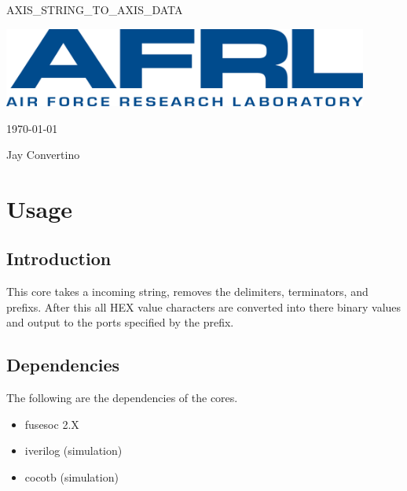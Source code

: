\begin{titlepage}
  \begin{center}

  {\Huge AXIS\_STRING\_TO\_AXIS\_DATA}

  \vspace{25mm}

  \includegraphics[width=0.90\textwidth,height=\textheight,keepaspectratio]{img/AFRL.png}

  \vspace{25mm}

  \today

  \vspace{15mm}

  {\Large Jay Convertino}

  \end{center}
\end{titlepage}

\tableofcontents

\newpage

\section{Usage}

\subsection{Introduction}

\par
This core takes a incoming string, removes the delimiters, terminators, and prefixs.
After this all HEX value characters are converted into there binary values and output
to the ports specified by the prefix.

\subsection{Dependencies}

\par
The following are the dependencies of the cores.

\begin{itemize}
  \item fusesoc 2.X
  \item iverilog (simulation)
  \item cocotb (simulation)
\end{itemize}


